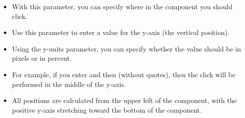 \begin{itemize}
\item With this parameter, you can specify where in the component you should click.
\item Use this parameter to enter a value for the y-axis (the vertical position).
\item Using the y-units parameter, you can specify whether the value should be in pixels or in percent. 
\item For example, if you enter  and then  (without quotes), then the click will be performed in the middle of the y-axis.
\item All positions are calculated from the upper left of the component, with the positive y-axis stretching toward the bottom of the component.
\end{itemize} 
